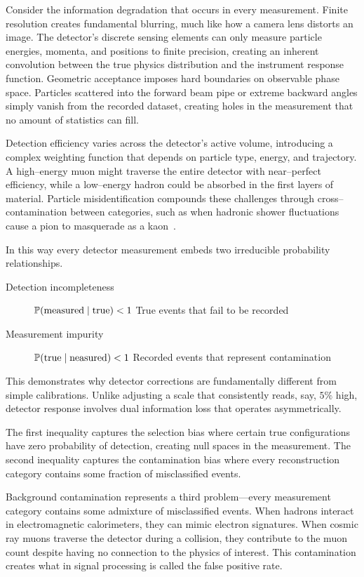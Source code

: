 \begin{definition}
    Consider the information degradation that occurs in every measurement. 
    Finite resolution creates fundamental blurring, much like how a camera lens distorts an image.
    The detector's discrete sensing elements can only measure particle energies, momenta, and positions to finite precision, creating an inherent convolution between the true physics distribution and the instrument response function.
    Geometric acceptance imposes hard boundaries on observable phase space.
    Particles scattered into the forward beam pipe or extreme backward angles simply vanish from the recorded dataset, creating holes in the measurement that no amount of statistics can fill.
    
    Detection efficiency varies across the detector's active volume, introducing a complex weighting function that depends on particle type, energy, and trajectory.
    A high--energy muon might traverse the entire detector with near--perfect efficiency, while a low--energy hadron could be absorbed in the first layers of material.
    Particle misidentification compounds these challenges through cross--contamination between categories, such as when hadronic shower fluctuations cause a pion to masquerade as a kaon~\cite{belle_collaboration_precision_2013}.

    In this way every detector measurement embeds two irreducible probability relationships.
    \begin{description}
        \item [Detection incompleteness] \(\P(\text{measured}\mid\text{true}) < 1\) True events that fail to be recorded
        \item [Measurement impurity] \(\P(\text{true}\mid\text{neasured}) < 1\) Recorded events that represent contamination
    \end{description}
    This demonstrates why detector corrections are fundamentally different from simple calibrations.
    Unlike adjusting a scale that consistently reads, say, \(5\%\) high, detector response involves dual information loss that operates asymmetrically.
    
    The first inequality captures the selection bias where certain true configurations have zero probability of detection, creating null spaces in the measurement.
    The second inequality captures the contamination bias where every reconstruction category contains some fraction of misclassified events.
    
    Background contamination represents a third problem---every measurement category contains some admixture of misclassified events.
    When hadrons interact in electromagnetic calorimeters, they can mimic electron signatures.
    When cosmic ray muons traverse the detector during a collision, they contribute to the muon count despite having no connection to the physics of interest.
    This contamination creates what in signal processing is called the false positive rate.
    

\end{definition}
